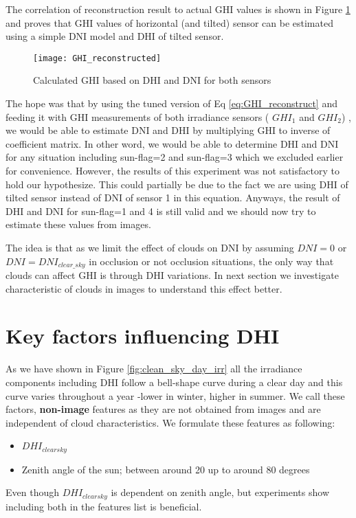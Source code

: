 The correlation of reconstruction result to actual GHI values is shown in Figure \ref{fig:GHI_reconstruct_result} and proves that GHI values of horizontal (and tilted) sensor can be estimated using a simple DNI model and DHI of tilted sensor.


\begin{figure}[h]
\caption{Calculated GHI based on DHI and DNI for both sensors}
\label{fig:GHI_reconstruct_result}
\texttt{[image: GHI\_reconstructed]}
\centering
\end{figure}

The hope was that by using the tuned version of Eq \ref{eq:GHI_reconstruct} and feeding it with GHI measurements of both irradiance sensors ( $GHI_1$ and  $GHI_2$) , we would be able to estimate DNI and DHI by multiplying GHI to inverse of coefficient matrix. In other word, we would be able to determine DHI and DNI for any situation including sun-flag=2 and sun-flag=3 which we excluded earlier for convenience. However, the results of this experiment was not satisfactory to hold our hypothesize. This could partially be due to the fact we are using DHI of tilted sensor instead of DNI of sensor 1 in this equation. Anyways,   the result of DHI and DNI for sun-flag=1 and 4 is still valid and we should now try to estimate these values from images.

The idea is that as we limit the effect of clouds on DNI by assuming $DNI=0$ or $DNI=DNI_{clear\_sky}$ in occlusion or not occlusion situations, the only way that clouds can affect GHI is through DHI variations. In next section we investigate characteristic of clouds in images to understand this effect better.

\section{Key factors influencing DHI}
\label{sec:img-features}
As we have shown in Figure \ref{fig:clean_sky_day_irr} all the irradiance components including DHI follow a bell-shape curve during a clear day and this curve varies throughout a year -lower in winter, higher in summer. We call these factors, \textbf{non-image} features as they are not obtained from images and are independent of cloud characteristics. We formulate these features as following:
\begin{itemize}
\item $DHI_{clear sky}$
\item Zenith angle of the sun; between around 20 up to around 80 degrees
\end{itemize}
Even though $DHI_{clear sky}$ is dependent on zenith angle, but experiments show including both in the features list is beneficial.
\newline

